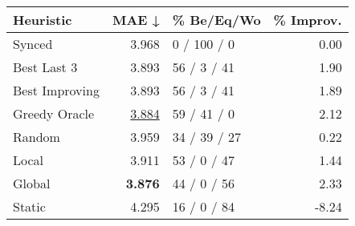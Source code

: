 \begin{tabular}{lrlr}
\toprule
\textbf{Heuristic} & \textbf{MAE ↓} & \textbf{\% Be/Eq/Wo} & \textbf{\% Improv.} \\
\midrule
            Synced &          3.968 &          0 / 100 / 0 &                0.00 \\
\midrule
       Best Last 3 &          3.893 &          56 / 3 / 41 &                1.90 \\
    Best Improving &          3.893 &          56 / 3 / 41 &                1.89 \\
\addlinespace
     Greedy Oracle &          \underline{3.884} &          59 / 41 / 0 &                2.12 \\
            Random &          3.959 &         34 / 39 / 27 &                0.22 \\
\midrule
             Local &          3.911 &          53 / 0 / 47 &                1.44 \\
            Global &          \textbf{3.876} &          44 / 0 / 56 &                2.33 \\
\midrule
            Static &          4.295 &          16 / 0 / 84 &               -8.24 \\
\bottomrule
\end{tabular}

\label{tab:ds_iid_lr01_le2_bs4_Summary}
